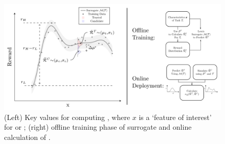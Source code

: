     
       \begin{figure}[tb]
        \centering
        \includegraphics[width=0.79\linewidth]{Figures/xQ_combined.png}
        \caption{(Left) Key values for computing \xQ, where $x$ is a `feature of interest' for \task or \solve; (right) offline training phase of surrogate \surrogate{} and online calculation of \xQ{}. }
        \label{fig:sq_v3}
        \vspace{-0.2cm}
    \end{figure}
    
